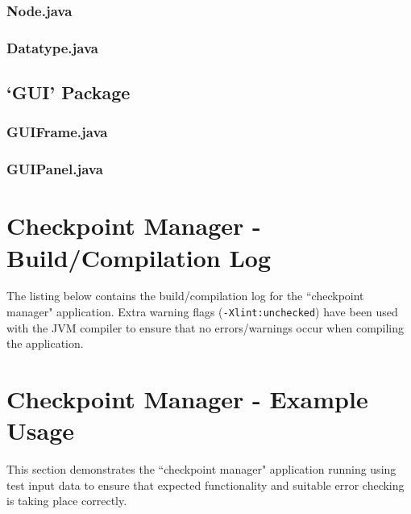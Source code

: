\documentclass[a4paper, 10pt]{article}
\begin{document}
\clearpage
\subsubsection{Node.java}


\clearpage
\subsubsection{Datatype.java}


\clearpage
\subsection{`GUI' Package}

\subsubsection{GUIFrame.java}


\clearpage
\subsubsection{GUIPanel.java}


\clearpage
\section{Checkpoint Manager - Build/Compilation Log}

The listing below contains the build/compilation log for the ``checkpoint manager" application. Extra warning flags (\verb+-Xlint:unchecked+) have been used with the JVM compiler to ensure that no errors/warnings occur when compiling the application. \\



\clearpage
\section{Checkpoint Manager - Example Usage}
This section demonstrates the ``checkpoint manager" application running using test input data to ensure that expected functionality and suitable error checking is taking place correctly.\\
\end{document}
